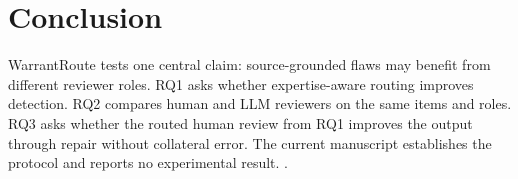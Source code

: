 \section{Conclusion}

WarrantRoute tests one central claim: source-grounded flaws may benefit from different reviewer roles. RQ1 asks whether expertise-aware routing improves detection. RQ2 compares human and LLM reviewers on the same items and roles. RQ3 asks whether the routed human review from RQ1 improves the output through repair without collateral error. The current manuscript establishes the protocol and reports no experimental result. .

